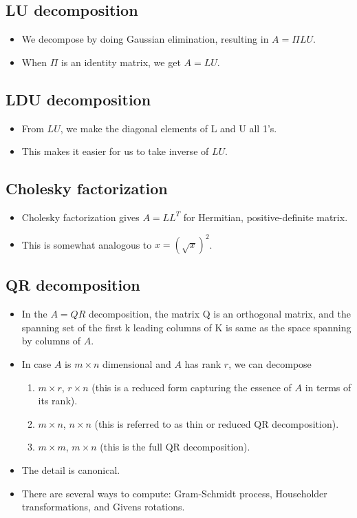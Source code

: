 \documentclass[11pt,reqno]{amsart}
\theoremstyle{remark}
\begin{document}
\subsection{LU decomposition}
\begin{itemize}
\item We decompose by doing Gaussian elimination, resulting in $A=\Pi LU$.
\item When $\Pi$ is an identity matrix, we get $A=LU$.
\end{itemize}
\subsection{LDU decomposition}
\begin{itemize}
\item From $LU$, we make the diagonal elements of L and U all 1's. 
\item This makes it easier for us to take inverse of $LU$. 
\end{itemize}
\subsection{Cholesky factorization}
\begin{itemize}
\item Cholesky factorization gives $A=LL^T$ for Hermitian, positive-definite matrix.
\item This is somewhat analogous to $x=(\sqrt x)^2$.
\end{itemize}
\subsection{QR decomposition}
\begin{itemize}
\item In the $A=QR$ decomposition, the matrix Q is an orthogonal matrix, 
and the spanning set of the first k leading columns of K is same as
 the space spanning by columns of $A$.
\item In case $A$ is $m\times n$ dimensional and $A$ has rank $r$, we
 can decompose
\begin{enumerate}
\item $m\times r$, $r\times n$ (this is a reduced form capturing the essence of $A$ in terms of its rank).
\item $m\times n$, $n\times n$ (this is referred to as thin or reduced QR decomposition).
\item $m\times m$, $m\times n$ (this is the full QR decomposition).
\end{enumerate}
\item The detail is canonical.
\item There are several ways to compute: Gram-Schmidt process, Householder transformations,
 and Givens rotations.
\end{itemize}
\end{document}
